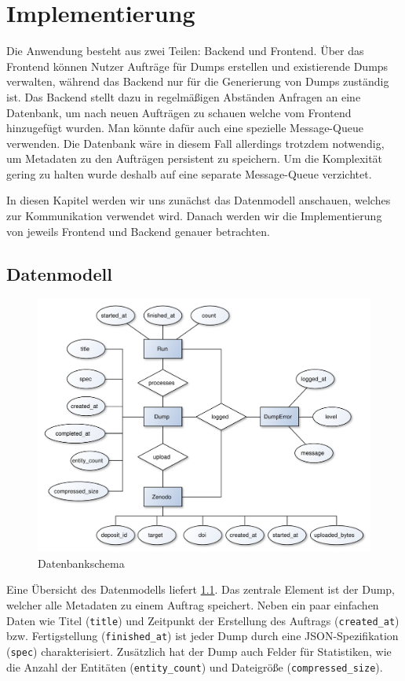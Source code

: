 \chapter{Implementierung}
\label{chap:implementation}

Die Anwendung besteht aus zwei Teilen: Backend und Frontend. Über das Frontend können Nutzer Aufträge für Dumps erstellen und existierende Dumps verwalten, während das Backend nur für die Generierung von Dumps zuständig ist.
Das Backend stellt dazu in regelmäßigen Abständen Anfragen an eine Datenbank, um nach neuen Aufträgen zu schauen welche vom Frontend hinzugefügt wurden.
Man könnte dafür auch eine spezielle Message-Queue verwenden. Die Datenbank wäre in diesem Fall allerdings trotzdem notwendig, um Metadaten zu den Aufträgen persistent zu speichern. Um die Komplexität gering zu halten wurde deshalb auf eine separate Message-Queue verzichtet.

In diesen Kapitel werden wir uns zunächst das Datenmodell anschauen, welches zur Kommunikation verwendet wird.
Danach werden wir die Implementierung von jeweils Frontend und Backend genauer betrachten.

\section{Datenmodell}
\begin{figure}
  \includegraphics[width=\textwidth]{pics/db-er}
  \caption{Datenbankschema}
  \label{fig:db-er}
\end{figure}
Eine Übersicht des Datenmodells liefert \cref{fig:db-er}.
Das zentrale Element ist der Dump, welcher alle Metadaten zu einem Auftrag speichert.
Neben ein paar einfachen Daten wie Titel (\verb|title|) und Zeitpunkt der Erstellung des Auftrags (\verb|created_at|) bzw. Fertigstellung (\verb|finished_at|) ist jeder Dump durch eine JSON-Spezifikation (\verb|spec|) charakterisiert. Zusätzlich hat der Dump auch Felder für Statistiken, wie die Anzahl der Entitäten (\verb|entity_count|) und Dateigröße (\verb|compressed_size|).

